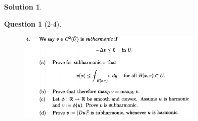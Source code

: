 \documentclass{article} %
\theoremstyle{quest}
\newtheorem*{question}{Question}
\newtheorem*{solution}{Solution}
\begin{document}
\begin{solution}
\end{solution}


\newpage

\begin{question}[2-4]
\hfill
\begin{figure}[h!]
  \centering
    \includegraphics[width=0.8\textwidth]{evans-2-4.png}
\end{figure}
\end{question}
\end{document}
